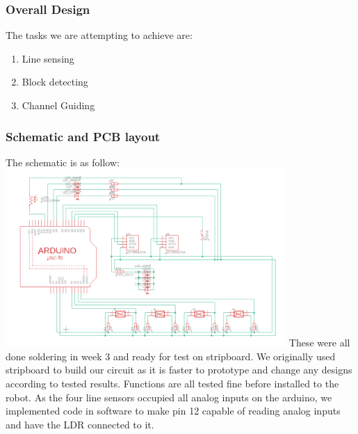 \documentclass{article}
\begin{document}
\subsubsection{Overall Design}
\quad The tasks we are attempting to achieve are:
\begin{enumerate}
    \item Line sensing
    \item Block detecting
    \item Channel Guiding
\end{enumerate}
\subsubsection{Schematic and PCB layout}
\quad The schematic is as follow:
\includegraphics[width=0.8\textwidth]{assets/Schematic.png}
These were all done soldering in week 3 and ready for test on stripboard. We originally used stripboard to build our circuit as it is faster to prototype and change any designs according to tested results. Functions are all tested fine before installed to the robot.
As the four line sensors occupied all analog inputs on the arduino, we implemented code in software to make pin 12 capable of  reading analog inputs and have the LDR connected to it.
\end{document}

